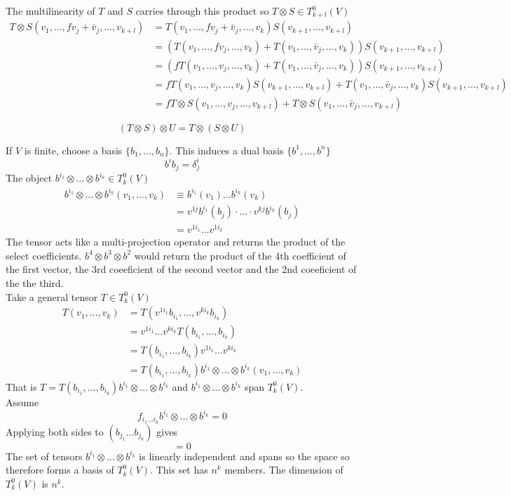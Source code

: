 \documentclass[a4paper]{scrartcl}
\begin{document}
The multilinearity of $T$ and $S$ carries through this product so $T\otimes S \in T_{k+l}^0(V)$
\begin{align*}
T\otimes S(v_{1}, \ldots, fv_{j} + \bar{v}_{j},\ldots, v_{k+l}) &=
T(v_{1}, \ldots, fv_{j} + \bar{v}_{j}, \ldots,v_{k})S(v_{k+1}, \ldots, v_{k+l}) \\ 
&=(T(v_{1}, \ldots, fv_{j}, \ldots,v_{k}) + T(v_{1}, \ldots, \bar{v}_{j}, \ldots,v_{k}))
S(v_{k+1}, \ldots, v_{k+l}) \\ 
&=(fT(v_{1}, \ldots, v_{j}, \ldots,v_{k})+T(v_{1}, \ldots, \bar{v}_{j}, \ldots,v_{k}))
S(v_{k+1}, \ldots, v_{k+l}) \\ 
&=fT(v_{1}, \ldots, v_{j}, \ldots,v_{k})S(v_{k+1}, \ldots, v_{k+l}) +
T(v_{1}, \ldots, \bar{v}_{j}, \ldots,v_{k})S(v_{k+1}, \ldots, v_{k+l}) \\
&= fT\otimes S(v_{1}, \ldots, v_{j},\ldots, v_{k+l}) +
T\otimes S(v_{1}, \ldots, \bar{v}_{j},\ldots, v_{k+l})
\end{align*}



$$(T\otimes S) \otimes U = T \otimes (S\otimes U)$$




If $V$ is finite, choose a basis $\{b_{1}, \ldots, b_{n}\}$. This induces a dual basis $\{b^{1}, \ldots, b^{n}\}$
$$b^{i}b_{j}=\delta^{i}_{j}$$
The object $b^{i_{1}}\otimes\ldots\otimes b^{i_{k}}\in T_{k}^0(V)$\\
\begin{align*}
b^{i_{1}}\otimes\ldots\otimes b^{i_{k}}(v_{1},\ldots,v_{k}) &\equiv 
b^{i_{1}}(v_{1})\ldots b^{i_{k}}(v_{k})\\
&= v^{1j}b^{i_{1}}(b_{j}) \cdot\ldots\cdot v^{kj}b^{i_{k}}(b_{j}) \\
&= v^{1i_{1}}\ldots v^{1i_{k}}
\end{align*}
The tensor acts like a multi-projection operator and returns the product of the select coefficients. $b^4\otimes b^3 \otimes b^2$ would return the product of the 4th coefficient of the first vector, the 3rd coeeficient of the second vector and the 2nd coeeficient of the the third. \\
Take a general tensor $T\in T_{k}^0(V)$
\begin{align*}
T(v_{1}, \ldots, v_{k}) &= T(v^{1i_{1}}b_{i_{1}}, \ldots, v^{ki_{k}}b_{i_{k}}) \\
&= v^{1i_{1}}\ldots v^{ki_{k}}T(b_{i_{1}}, \ldots, b_{i_{k}}) \\
&= T(b_{i_{1}}, \ldots, b_{i_{k}}) v^{1i_{1}}\ldots v^{ki_{k}} \\
&= T(b_{i_{1}}, \ldots, b_{i_{k}}) b^{i_{1}}\otimes\ldots\otimes b^{i_{k}}(v_{1},\ldots,v_{k})
\end{align*}
That is $T = T(b_{i_{1}}, \ldots, b_{i_{k}}) b^{i_{1}}\otimes\ldots\otimes b^{i_{k}}$ and $b^{i_{1}}\otimes\ldots\otimes b^{i_{k}}$ span $T_{k}^0(V)$.\\
Assume 
$$ f_{i_{1}\ldots i_{k}}b^{i_{1}}\otimes\ldots\otimes b^{i_{k}} = 0$$
Applying both sides to $(b_{j_{1}}\ldots b_{j_{k}})$ gives
$$ =0$$
The set of tensors $b^{i_{1}}\otimes\ldots\otimes b^{i_{k}}$ is linearly independent and spans so the space so therefore forms a basis of $T_{k}^0(V)$. This set has $n^k$ members. The dimension of $T_{k}^0(V)$ is $n^k$.
\end{document}
